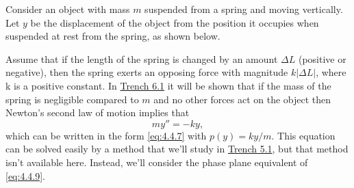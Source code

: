 \documentclass{ximera}
\begin{document}
 
 
\begin{example}\label{example:4.4.1}
 Consider an object with mass $m$ suspended from a
spring and moving vertically. Let $y$ be the displacement of the
object from the position it occupies when suspended at rest from the
spring, as shown below.

\begin{center}
\end{center}
 
 
Assume that if the length of the spring is changed by an amount
$\Delta L$ (positive or negative), then the spring exerts an opposing
force with magnitude $k|\Delta L|$, where k is a positive constant. In \href{https://ximera.osu.edu/ode/main/springProblemsI/springProblemsI}{Trench 6.1} it will be shown that if the mass of the spring
is negligible compared to $m$ and no other forces act on the object then
Newton's second law of motion implies that
\begin{equation} \label{eq:4.4.9}
my''=-ky,
\end{equation}
which can be written in the form \eqref{eq:4.4.7} with $p(y)=ky/m$. This
equation can be solved easily by a method that we'll study in
 \href{https://ximera.osu.edu/ode/main/constantCoefficientHomogeneousEquations/constantCoefficientHomogeneousEquations}{Trench 5.1}, but that method isn't available here. Instead,
we'll consider the phase plane equivalent of \eqref{eq:4.4.9}.
 

\end{example}
\end{document}
